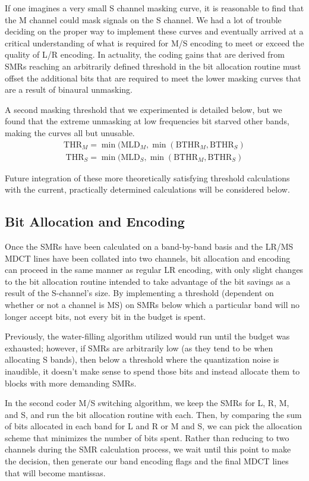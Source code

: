 \documentclass{vldb}
\begin{document}
If one imagines a very small S channel masking curve, it is reasonable to find that the M channel could mask signals on the S channel. We had a lot of trouble deciding on the proper way to implement these curves and eventually arrived at a critical understanding of what is required for M/S encoding to meet or exceed the quality of L/R encoding. In actuality, the coding gains that are derived from SMRs reaching an arbitrarily defined threshold in the bit allocation routine must offset the additional bits that are required to meet the lower masking curves that are a result of binaural unmasking.

A second masking threshold that we experimented is detailed below, but we found that the extreme unmasking at low frequencies bit starved other bands, making the curves all but unusable.
\begin{align*}
\text{THR}_M = \min(\text{MLD}_M, \min( \text{BTHR}_M, \text{BTHR}_S )
\end{align*}
\begin{align*}
\text{THR}_S = \min(\text{MLD}_S, \min( \text{BTHR}_M, \text{BTHR}_S )
\end{align*}

Future integration of these more theoretically satisfying threshold calculations with the current, practically determined calculations will be considered below.

\subsection{Bit Allocation and Encoding}
Once the SMRs have been calculated on a band-by-band basis and the LR/MS MDCT lines have been collated into two channels, bit allocation and encoding can proceed in the same manner as regular LR encoding, with only slight changes to the bit allocation routine intended to take advantage of the bit savings as a result of the S-channel's size. By implementing a threshold (dependent on whether or not a channel is MS) on SMRs below which a particular band will no longer accept bits, not every bit in the budget is spent.

Previously, the water-filling algorithm utilized would run until the budget was exhausted; however, if SMRs are arbitrarily low (as they tend to be when allocating S bands), then below a threshold where the quantization noise is inaudible, it doesn't make sense to spend those bits and instead allocate them to blocks with more demanding SMRs.

In the second coder M/S switching algorithm, we keep the SMRs for L, R, M, and S, and run the bit allocation routine with each. Then, by comparing the sum of bits allocated in each band for L and R or M and S, we can pick the allocation scheme that minimizes the number of bits spent. Rather than reducing to two channels during the SMR calculation process, we wait until this point to make the decision, then generate our band encoding flags and the final MDCT lines that will become mantissas.
\end{document}
